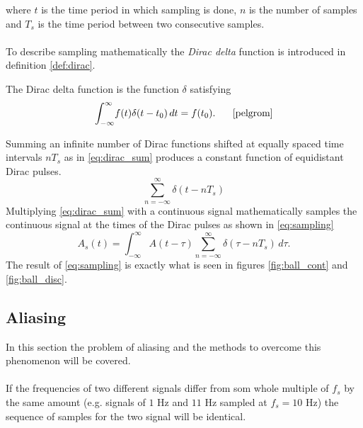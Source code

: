 where $t$ is the time period in which sampling is done, $n$ is the number of samples and $T_s$ is the time period between two consecutive samples.\\\\
To describe sampling mathematically the \textit{Dirac delta} function is introduced in definition \ref{def:dirac}.
\begin{definition}\label{def:dirac}
The Dirac delta function is the function $\delta$ satisfying
\begin{equation}
\int_{-\infty}^{\infty} \! f(t)\delta(t-t_0) \, dt=f(t_0).\phantom{mm}\text{\cite{pelgrom}}
\end{equation}
\end{definition}
Summing an infinite number of Dirac functions shifted at equally spaced time intervals $nT_s$ as in \eqref{eq:dirac_sum} produces a constant function of equidistant Dirac pulses.
\begin{equation}\label{eq:dirac_sum}
\sum_{n=-\infty}^{\infty}\delta(t-nT_s)
\end{equation}
Multiplying \eqref{eq:dirac_sum} with a continuous signal mathematically samples the continuous signal at the times of the Dirac pulses as shown in \eqref{eq:sampling}
\begin{equation}\label{eq:sampling}
A_s(t)=\int_{-\infty}^{\infty} \! A(t-\tau)\sum_{n=-\infty}^{\infty}\delta(\tau - nT_s) \, d\tau.
\end{equation}
The result of \eqref{eq:sampling} is exactly what is seen in figures \ref{fig:ball_cont} and \ref{fig:ball_disc}.
\subsection{Aliasing}\label{sec:aliasing}
In this section the problem of aliasing and the methods to overcome this phenomenon will be covered.\\\\
If the frequencies of two different signals differ from som whole multiple of $f_s$ by the same amount (e.g. signals of $1$ Hz and $11$ Hz sampled at $f_s=10$ Hz) the sequence of samples for the two signal will be identical. 





